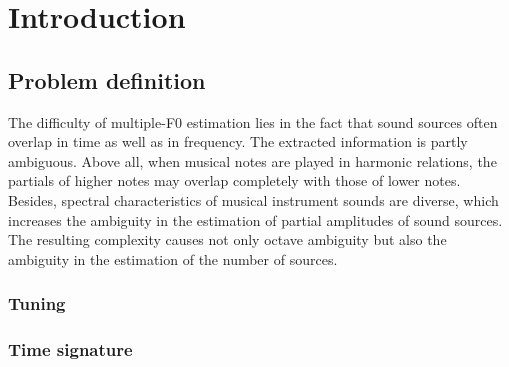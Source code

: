 \chapter{Introduction}\label{ch:introduction}


\section{Problem definition}\label{sec:problem-definition}



The difficulty of multiple-F0 estimation lies in the fact that sound sources often overlap in time as well as in frequency. The extracted information is partly ambiguous.
Above all, when musical notes are played in harmonic relations, the partials of higher
notes may overlap completely with those of lower notes. Besides, spectral characteristics of musical instrument sounds are diverse, which increases the ambiguity in the
estimation of partial amplitudes of sound sources. The resulting complexity causes
not only octave ambiguity but also the ambiguity in the estimation of the number of
sources.


\subsection{Tuning}\label{subsec:tuning}
\subsection{Time signature}\label{subsec:time-signature}

